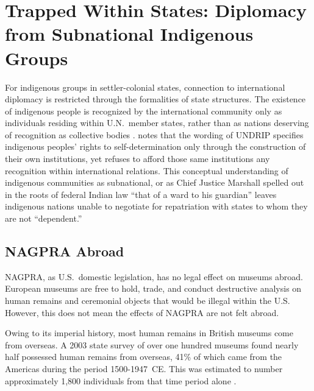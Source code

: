 \documentclass[american]{../../../coursework}
\begin{document}
\section{Trapped Within States: Diplomacy from Subnational Indigenous Groups}

For indigenous groups in settler-colonial states, connection to international
diplomacy is restricted through the formalities of state structures. The
existence of indigenous people is recognized by the international community
only as individuals residing within U.N.\ member states, rather than as
nations deserving of recognition as collective bodies \parencite{Sch12}.
\textcite{Car12} notes that the wording of UNDRIP specifies indigenous
peoples' rights to self-determination only through the construction of their
own institutions, yet refuses to afford those same institutions any
recognition within international relations. This conceptual understanding of
indigenous communities as subnational, or as Chief Justice Marshall spelled
out in the roots of federal Indian law ``that of a ward to his guardian''
\parencite[2]{The31} leaves indigenous nations unable to negotiate for
repatriation with states to whom they are not ``dependent.''

\subsection{NAGPRA Abroad}

NAGPRA, as U.S.\ domestic legislation, has no legal effect on museums abroad.
European museums are free to hold, trade, and conduct destructive analysis on
human remains and ceremonial objects that would be illegal within the U.S\@.
However, this does not mean the effects of NAGPRA are not felt abroad.

Owing to its imperial history, most human remains in British museums come from
overseas. A 2003 state survey of over one hundred museums found nearly half
possessed human remains from overseas, 41\% of which came from the Americas
during the period 1500-1947~CE\@. This was estimated to number approximately
1,800 individuals from that time period alone \parencite{Wee03}.
\end{document}
